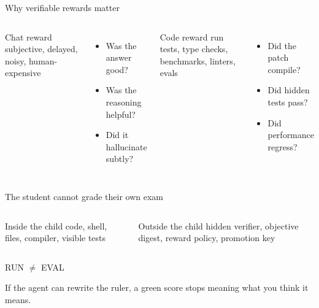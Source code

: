 \begin{frame}{Why verifiable rewards matter}
\begin{columns}[T,onlytextwidth]
\begin{block}{Chat reward}
\centering
\large subjective, delayed, noisy, human-expensive
\end{block}
\begin{itemize}
  \item Was the answer good?
  \item Was the reasoning helpful?
  \item Did it hallucinate subtly?
\end{itemize}
\begin{block}{Code reward}
\centering
\large run tests, type checks, benchmarks, linters, evals
\end{block}
\begin{itemize}
  \item Did the patch compile?
  \item Did hidden tests pass?
  \item Did performance regress?
\end{itemize}
\end{columns}
\vspace{0.6em}
\Large \centering {}
\end{frame}

\begin{frame}{The student cannot grade their own exam}
\begin{columns}[T,onlytextwidth]
\begin{block}{Inside the child}
\centering
\large code, shell, files, compiler, visible tests
\end{block}
\vspace{0.4em}
\centering{}
\begin{block}{Outside the child}
\centering
\large hidden verifier, objective digest, reward policy, promotion key
\end{block}
\vspace{0.4em}
\centering{}
\end{columns}
\vspace{0.9em}
\begin{center}
\Huge RUN $\ne$ EVAL
\end{center}
\vspace{0.25em}
\centering\large If the agent can rewrite the ruler, a green score stops meaning what you think it means.
\end{frame}

